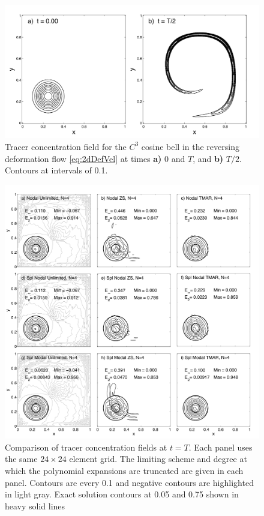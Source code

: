 \documentclass{ametsoc}
\begin{document}
\begin{figure}[t]
\includegraphics[width= 0.8 \textwidth]{figs/2d/defCosbellExact.pdf}
\caption{Tracer concentration field for the $C^3$ cosine bell in the reversing deformation flow \eqref{eq:2dDefVel} at times \textbf{a)} 0 and $T$, and  \textbf{b)} $T/2$. Contours at intervals of 0.1.}
\label{fig:cosbellExact}
\end{figure}

\begin{figure}[t]
\includegraphics[width=\textwidth]{figs/2d/_defCosbell_9pan_24e.pdf}
\caption{Comparison of tracer concentration fields at $t=T$. Each panel uses the same $24\times24$ element grid. The limiting scheme and degree at which the polynomial expansions are truncated are given in each panel. Contours are every 0.1 and negative contours are highlighted in light gray. Exact solution contours at 0.05 and 0.75 shown in heavy solid lines}\label{fig:2dCosbell24}
\end{figure}
\end{document}
